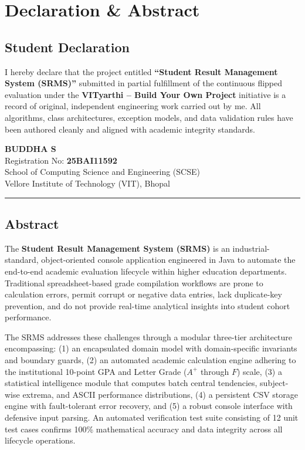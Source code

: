 \documentclass[12pt,a4paper]{report}
\begin{document}
\chapter*{Declaration \& Abstract}

\section*{Student Declaration}
I hereby declare that the project entitled \textbf{``Student Result Management System (SRMS)''} submitted in partial fulfillment of the continuous flipped evaluation under the \textbf{VITyarthi -- Build Your Own Project} initiative is a record of original, independent engineering work carried out by me. All algorithms, class architectures, exception models, and data validation rules have been authored cleanly and aligned with academic integrity standards.

\vspace{1.0cm}
\noindent
\textbf{BUDDHA S}\\
Registration No: \textbf{25BAI11592}\\
School of Computing Science and Engineering (SCSE)\\
Vellore Institute of Technology (VIT), Bhopal

\vspace{1.5cm}
\hrule
\vspace{0.8cm}

\section*{Abstract}
The \textbf{Student Result Management System (SRMS)} is an industrial-standard, object-oriented console application engineered in Java to automate the end-to-end academic evaluation lifecycle within higher education departments. Traditional spreadsheet-based grade compilation workflows are prone to calculation errors, permit corrupt or negative data entries, lack duplicate-key prevention, and do not provide real-time analytical insights into student cohort performance.

The SRMS addresses these challenges through a modular three-tier architecture encompassing: (1) an encapsulated domain model with domain-specific invariants and boundary guards, (2) an automated academic calculation engine adhering to the institutional 10-point GPA and Letter Grade ($A^+$ through $F$) scale, (3) a statistical intelligence module that computes batch central tendencies, subject-wise extrema, and ASCII performance distributions, (4) a persistent CSV storage engine with fault-tolerant error recovery, and (5) a robust console interface with defensive input parsing. An automated verification test suite consisting of 12 unit test cases confirms 100\% mathematical accuracy and data integrity across all lifecycle operations.
\end{document}
